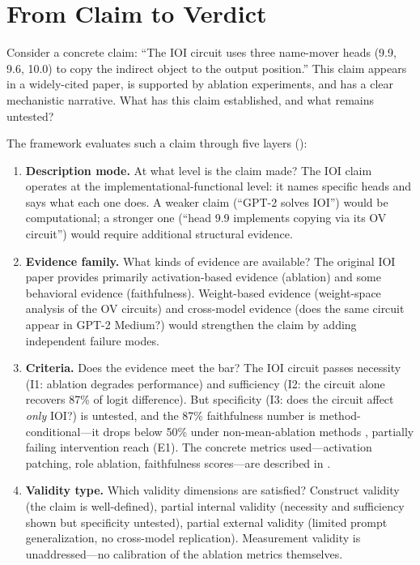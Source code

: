 \documentclass{article}
\begin{document}
\section{From Claim to Verdict}
\label{sec:overview}

Consider a concrete claim: ``The IOI circuit uses three name-mover heads (9.9, 9.6, 10.0) to copy the indirect object to the output position.'' This claim appears in a widely-cited paper, is supported by ablation experiments, and has a clear mechanistic narrative. What has this claim established, and what remains untested?

The framework evaluates such a claim through five layers ():

\begin{enumerate}[nosep]
\item \textbf{Description mode.} At what level is the claim made? The IOI claim operates at the implementational-functional level: it names specific heads and says what each one does. A weaker claim (``GPT-2 solves IOI'') would be computational; a stronger one (``head 9.9 implements copying via its OV circuit'') would require additional structural evidence.

\item \textbf{Evidence family.} What kinds of evidence are available? The original IOI paper provides primarily activation-based evidence (ablation) and some behavioral evidence (faithfulness). Weight-based evidence (weight-space analysis of the OV circuits) and cross-model evidence (does the same circuit appear in GPT-2 Medium?) would strengthen the claim by adding independent failure modes.

\item \textbf{Criteria.} Does the evidence meet the bar? The IOI circuit passes necessity (I1: ablation degrades performance) and sufficiency (I2: the circuit alone recovers 87\% of logit difference). But specificity (I3: does the circuit affect \emph{only} IOI?) is untested, and the 87\% faithfulness number is method-conditional---it drops below 50\% under non-mean-ablation methods \citep{miller2024transformer}, partially failing intervention reach (E1). The concrete metrics used---activation patching, role ablation, faithfulness scores---are described in .

\item \textbf{Validity type.} Which validity dimensions are satisfied? Construct validity (the claim is well-defined), partial internal validity (necessity and sufficiency shown but specificity untested), partial external validity (limited prompt generalization, no cross-model replication). Measurement validity is unaddressed---no calibration of the ablation metrics themselves.


\end{enumerate}
\end{document}
